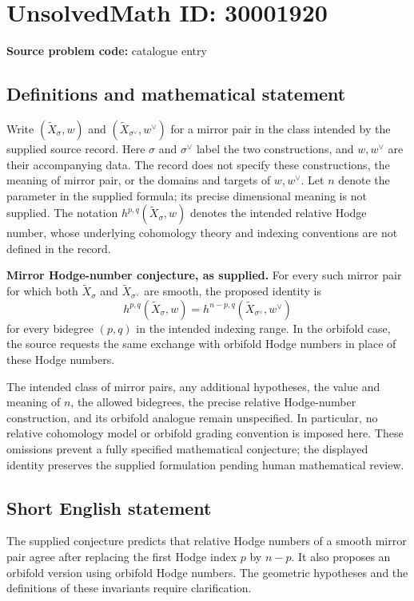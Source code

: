 \documentclass[11pt]{article}
\begin{document}
\section*{UnsolvedMath ID: 30001920}
\textbf{Source problem code:} catalogue entry
\subsection{Definitions and mathematical statement}
Write \((\widetilde X_\sigma,w)\) and \((\widetilde X_{\sigma^\vee},w^\vee)\) for a mirror pair in the class intended by the supplied source record. Here \(\sigma\) and \(\sigma^\vee\) label the two constructions, and \(w,w^\vee\) are their accompanying data. The record does not specify these constructions, the meaning of mirror pair, or the domains and targets of \(w,w^\vee\). Let \(n\) denote the parameter in the supplied formula; its precise dimensional meaning is not supplied. The notation \(h^{p,q}(\widetilde X_\sigma,w)\) denotes the intended relative Hodge number, whose underlying cohomology theory and indexing conventions are not defined in the record.

\textbf{Mirror Hodge-number conjecture, as supplied.} For every such mirror pair for which both \(\widetilde X_\sigma\) and \(\widetilde X_{\sigma^\vee}\) are smooth, the proposed identity is
\[
 h^{p,q}(\widetilde X_\sigma,w)
 =h^{n-p,q}(\widetilde X_{\sigma^\vee},w^\vee)
\]
for every bidegree \((p,q)\) in the intended indexing range. In the orbifold case, the source requests the same exchange with orbifold Hodge numbers in place of these Hodge numbers.

The intended class of mirror pairs, any additional hypotheses, the value and meaning of \(n\), the allowed bidegrees, the precise relative Hodge-number construction, and its orbifold analogue remain unspecified. In particular, no relative cohomology model or orbifold grading convention is imposed here. These omissions prevent a fully specified mathematical conjecture; the displayed identity preserves the supplied formulation pending human mathematical review.
\subsection{Short English statement}
The supplied conjecture predicts that relative Hodge numbers of a smooth mirror pair agree after replacing the first Hodge index \(p\) by \(n-p\). It also proposes an orbifold version using orbifold Hodge numbers. The geometric hypotheses and the definitions of these invariants require clarification.
\end{document}
